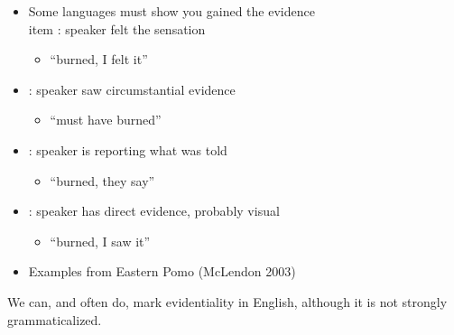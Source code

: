 \documentclass[a4paper,landscape,headrule,footrule,xetex]{foils}
\begin{document}
\newcommand{\TIPA}[1]{\textipa{\mtcitestyle{#1}}}

\begin{itemize}
\item  Some languages must show you gained the evidence
\\item  {}:  speaker felt the sensation
  \begin{itemize}
  \item {} ``burned, I felt it''
  \end{itemize}
\item  {}: speaker saw circumstantial evidence 
  \begin{itemize}
  \item  {}  ``must have burned''
  \end{itemize}
\item  {}:   speaker is reporting what was told
  \begin{itemize}
  \item  {} ``burned, they say''
  \end{itemize}
\item  {}:   speaker has direct evidence, probably visual 
  \begin{itemize}
  \item {} ``burned, I saw it''
  \end{itemize}
\item Examples from Eastern Pomo (McLendon 2003)
\end{itemize}


We can, and often do, mark evidentiality in English, although it is
not strongly grammaticalized.

\begin{exe}
\ex {}
\ex {}
\ex {}
\ex {}
\ex {}
\ex {}
\ex {}
\end{exe}




\end{document}
